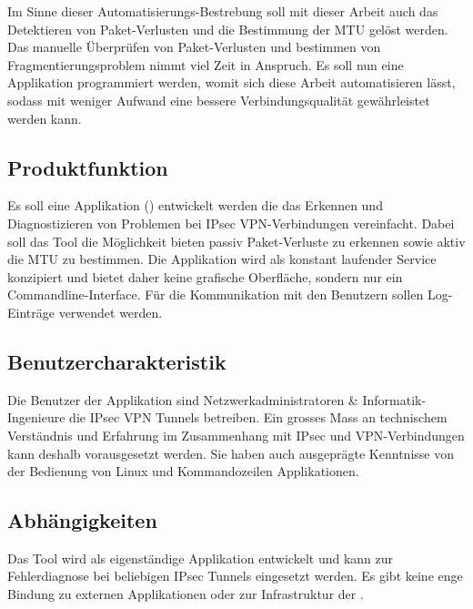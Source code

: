 Im Sinne dieser Automatisierungs-Bestrebung soll mit dieser Arbeit auch das Detektieren von Paket-Verlusten und die Bestimmung der MTU gelöst werden.
Das manuelle Überprüfen von Paket-Verlusten und bestimmen von Fragmentierungsproblem nimmt viel Zeit in Anspruch. Es soll nun eine Applikation programmiert werden, womit sich diese Arbeit automatisieren lässt, sodass mit weniger Aufwand eine bessere Verbindungsqualität gewährleistet werden kann.


\subsection{Produktfunktion}
Es soll eine Applikation (\tool{}) entwickelt werden die das Erkennen und Diagnostizieren von Problemen bei \acs{IPsec} \acs{VPN}-Verbindungen vereinfacht. Dabei soll das Tool die Möglichkeit bieten passiv Paket-Verluste zu erkennen sowie aktiv die \acs{MTU} zu bestimmen. Die Applikation wird als konstant laufender Service konzipiert und bietet daher keine grafische Oberfläche, sondern nur ein Commandline-Interface. Für die Kommunikation mit den Benutzern sollen Log-Einträge verwendet werden.

\subsection{Benutzercharakteristik}
Die Benutzer der Applikation sind Netzwerkadministratoren \& Informatik-Ingenieure die \acs{IPsec} \acs{VPN} Tunnels betreiben. Ein grosses Mass an technischem Verständnis und Erfahrung im Zusammenhang mit \acs{IPsec} und \acs{VPN}-Verbindungen kann deshalb vorausgesetzt werden. Sie haben auch ausgeprägte Kenntnisse von der Bedienung von Linux und Kommandozeilen Applikationen.

\subsection{Abhängigkeiten}
Das Tool wird als eigenständige Applikation entwickelt und kann zur Fehlerdiagnose bei beliebigen \acs{IPsec} Tunnels eingesetzt werden. Es gibt keine enge Bindung zu externen Applikationen oder zur Infrastruktur der \osag{}.